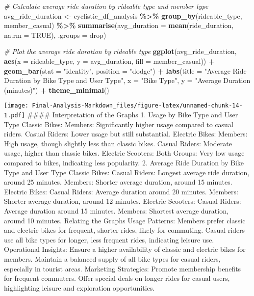 \documentclass[
]{article}
\newenvironment{Shaded}{\begin{snugshade}}{\end{snugshade}}
\newcommand{\AttributeTok}[1]{\textcolor[rgb]{0.13,0.29,0.53}{#1}}
\newcommand{\CommentTok}[1]{\textcolor[rgb]{0.56,0.35,0.01}{\textit{#1}}}
\newcommand{\ConstantTok}[1]{\textcolor[rgb]{0.56,0.35,0.01}{#1}}
\newcommand{\FunctionTok}[1]{\textcolor[rgb]{0.13,0.29,0.53}{\textbf{#1}}}
\newcommand{\NormalTok}[1]{#1}
\newcommand{\OtherTok}[1]{\textcolor[rgb]{0.56,0.35,0.01}{#1}}
\newcommand{\SpecialCharTok}[1]{\textcolor[rgb]{0.81,0.36,0.00}{\textbf{#1}}}
\newcommand{\StringTok}[1]{\textcolor[rgb]{0.31,0.60,0.02}{#1}}
\begin{document}
\begin{Shaded}
\begin{Highlighting}[]
\CommentTok{\# Calculate average ride duration by rideable type and member type}
\NormalTok{avg\_ride\_duration }\OtherTok{\textless{}{-}}\NormalTok{ cyclistic\_df\_analysis }\SpecialCharTok{\%\textgreater{}\%}
  \FunctionTok{group\_by}\NormalTok{(rideable\_type, member\_casual) }\SpecialCharTok{\%\textgreater{}\%}
  \FunctionTok{summarise}\NormalTok{(}\AttributeTok{avg\_duration =} \FunctionTok{mean}\NormalTok{(ride\_duration, }\AttributeTok{na.rm =} \ConstantTok{TRUE}\NormalTok{), }\AttributeTok{.groups =} \StringTok{\textquotesingle{}drop\textquotesingle{}}\NormalTok{)}

\CommentTok{\# Plot the average ride duration by rideable type}
\FunctionTok{ggplot}\NormalTok{(avg\_ride\_duration, }\FunctionTok{aes}\NormalTok{(}\AttributeTok{x =}\NormalTok{ rideable\_type, }\AttributeTok{y =}\NormalTok{ avg\_duration, }\AttributeTok{fill =}\NormalTok{ member\_casual)) }\SpecialCharTok{+}
  \FunctionTok{geom\_bar}\NormalTok{(}\AttributeTok{stat =} \StringTok{"identity"}\NormalTok{, }\AttributeTok{position =} \StringTok{"dodge"}\NormalTok{) }\SpecialCharTok{+}
  \FunctionTok{labs}\NormalTok{(}\AttributeTok{title =} \StringTok{"Average Ride Duration by Bike Type and User Type"}\NormalTok{, }\AttributeTok{x =} \StringTok{"Bike Type"}\NormalTok{, }\AttributeTok{y =} \StringTok{"Average Duration (minutes)"}\NormalTok{) }\SpecialCharTok{+}
  \FunctionTok{theme\_minimal}\NormalTok{()}
\end{Highlighting}
\end{Shaded}

\texttt{[image: Final-Analysis-Markdown\_files/figure-latex/unnamed-chunk-14-1.pdf]}
\#\#\#\# Interpretation of the Graphs 1. Usage by Bike Type and User
Type Classic Bikes: Members: Significantly higher usage compared to
casual riders. Casual Riders: Lower usage but still substantial.
Electric Bikes: Members: High usage, though slightly less than classic
bikes. Casual Riders: Moderate usage, higher than classic bikes.
Electric Scooters: Both Groups: Very low usage compared to bikes,
indicating less popularity. 2. Average Ride Duration by Bike Type and
User Type Classic Bikes: Casual Riders: Longest average ride duration,
around 25 minutes. Members: Shorter average duration, around 15 minutes.
Electric Bikes: Casual Riders: Average duration around 20 minutes.
Members: Shorter average duration, around 12 minutes. Electric Scooters:
Casual Riders: Average duration around 15 minutes. Members: Shortest
average duration, around 10 minutes. Relating the Graphs Usage Patterns:
Members prefer classic and electric bikes for frequent, shorter rides,
likely for commuting. Casual riders use all bike types for longer, less
frequent rides, indicating leisure use. Operational Insights: Ensure a
higher availability of classic and electric bikes for members. Maintain
a balanced supply of all bike types for casual riders, especially in
tourist areas. Marketing Strategies: Promote membership benefits for
frequent commuters. Offer special deals on longer rides for casual
users, highlighting leisure and exploration opportunities.
\end{document}
